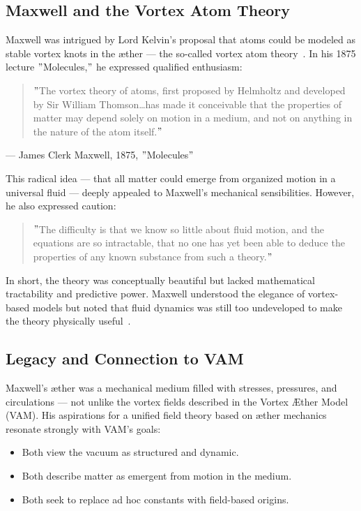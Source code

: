 \documentclass[preprint,notitlepage]{revtex4-2}
\begin{document}
    \subsection*{Maxwell and the Vortex Atom Theory}

    Maxwell was intrigued by Lord Kelvin's proposal that atoms could be modeled as stable vortex knots in the æther — the so-called vortex atom theory~\cite{maxwell1875molecules}. In his 1875 lecture \("\)Molecules,\("\) he expressed qualified enthusiasm:

    \begin{quote}
    \("\)The vortex theory of atoms, first proposed by Helmholtz and developed by Sir William Thomson\ldots has made it conceivable that the properties of matter may depend solely on motion in a medium, and not on anything in the nature of the atom itself.\("\)
    \end{quote}
   \hfill — James Clerk Maxwell, 1875, \("\)Molecules\("\)

    This radical idea — that all matter could emerge from organized motion in a universal fluid — deeply appealed to Maxwell's mechanical sensibilities. However, he also expressed caution:

    \begin{quote}
    \("\)The difficulty is that we know so little about fluid motion, and the equations are so intractable, that no one has yet been able to deduce the properties of any known substance from such a theory.\("\)
    \end{quote}

    In short, the theory was conceptually beautiful but lacked mathematical tractability and predictive power. Maxwell understood the elegance of vortex-based models but noted that fluid dynamics was still too undeveloped to make the theory physically useful~\cite{maxwell1875molecules}.

    \subsection*{Legacy and Connection to VAM}

    Maxwell's æther was a mechanical medium filled with stresses, pressures, and circulations — not unlike the vortex fields described in the Vortex Æther Model (VAM). His aspirations for a unified field theory based on æther mechanics resonate strongly with VAM's goals:

    \begin{itemize}
      \item Both view the vacuum as structured and dynamic.
      \item Both describe matter as emergent from motion in the medium.
      \item Both seek to replace ad hoc constants with field-based origins.
    \end{itemize}
\end{document}
